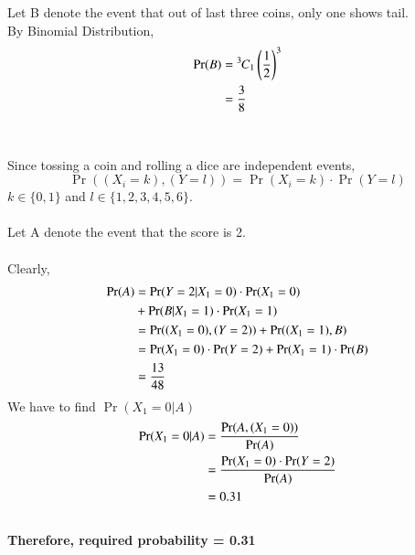 \documentclass[journal,12pt,twocolumn]{IEEEtran}
\newcommand{\permcomb}[4][0mu]{{{}^{#3}\mkern#1#2_{#4}}}
\newcommand*{\comb}[1][-1mu]{\permcomb[#1]{C}}
\begin{document}
Let B denote the event that out of last three coins, only one shows tail. \\
By Binomial Distribution,
\begin{align}
\Pr(B)&=\comb{3}{1}\brak{{\dfrac{1}{2}}}^3
\\[\parskip]
&=\dfrac{3}{8}
\end{align}
\\\\
Since tossing a coin and rolling a dice are independent events,
\begin{equation}\label{independent theorem}
\Pr( (X_i=k),(Y=l) )= \Pr(X_i=k)\cdot \Pr(Y=l)
\end{equation}
$k\in\{0,1\}$ and $l\in\{1,2,3,4,5,6\}$.
\\\\
Let A denote the event that the score is 2.
\\\\
Clearly,
\begin{align}
\Pr(A)\nonumber&=\Pr(Y=2|X_1=0)\cdot \Pr(X_1=0) \\
    &+ \Pr(B|X_1=1)\cdot \Pr(X_1=1) 
\\[\parskip]
&=\Pr( (X_1=0),(Y=2) ) + \Pr( (X_1=1), B)
\\[\parskip]
&=\Pr(X_1=0)\cdot \Pr(Y=2)+ \Pr(X_1=1) \cdot \Pr(B)
\\[\parskip]
&=\dfrac{13}{48}
\end{align}
We have to find $\Pr(X_1=0|A)$
\begin{align}
\Pr(X_1=0|A)&=\dfrac{\Pr(A,(X_1=0) )}{\Pr(A)}
\\[\parskip]
&=\dfrac{\Pr(X_1=0)\cdot \Pr(Y=2)}{\Pr(A)}
\\[\parskip]
&=0.31
\end{align}
\\
\textbf{Therefore, required probability = 0.31}
\end{document}
